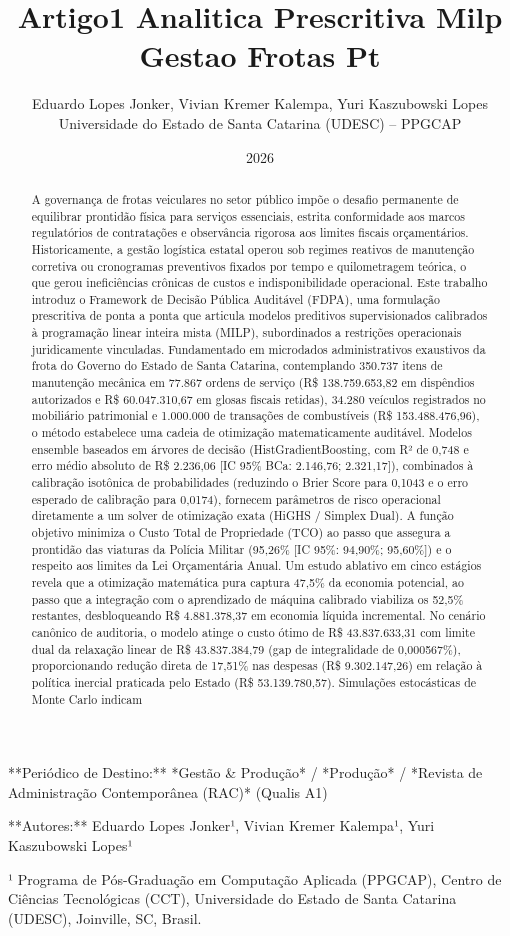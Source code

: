 \documentclass[10pt,a4paper,journal]{article}
\title{Artigo1 Analitica Prescritiva Milp Gestao Frotas Pt}
\author{Eduardo Lopes Jonker, Vivian Kremer Kalempa, Yuri Kaszubowski Lopes\\ \small Universidade do Estado de Santa Catarina (UDESC) -- PPGCAP}
\date{2026}
\begin{document}
\maketitle

**Periódico de Destino:** *Gestão \& Produção* / *Produção* / *Revista de Administração Contemporânea (RAC)* (Qualis A1)

**Autores:** Eduardo Lopes Jonker¹, Vivian Kremer Kalempa¹, Yuri Kaszubowski Lopes¹

¹ Programa de Pós-Graduação em Computação Aplicada (PPGCAP), Centro de Ciências Tecnológicas (CCT), Universidade do Estado de Santa Catarina (UDESC), Joinville, SC, Brasil.

\begin{abstract}
A governança de frotas veiculares no setor público impõe o desafio permanente de equilibrar prontidão física para serviços essenciais, estrita conformidade aos marcos regulatórios de contratações e observância rigorosa aos limites fiscais orçamentários. Historicamente, a gestão logística estatal operou sob regimes reativos de manutenção corretiva ou cronogramas preventivos fixados por tempo e quilometragem teórica, o que gerou ineficiências crônicas de custos e indisponibilidade operacional. Este trabalho introduz o Framework de Decisão Pública Auditável (FDPA), uma formulação prescritiva de ponta a ponta que articula modelos preditivos supervisionados calibrados à programação linear inteira mista (MILP), subordinados a restrições operacionais juridicamente vinculadas. Fundamentado em microdados administrativos exaustivos da frota do Governo do Estado de Santa Catarina, contemplando 350.737 itens de manutenção mecânica em 77.867 ordens de serviço (R\$ 138.759.653,82 em dispêndios autorizados e R\$ 60.047.310,67 em glosas fiscais retidas), 34.280 veículos registrados no mobiliário patrimonial e 1.000.000 de transações de combustíveis (R\$ 153.488.476,96), o método estabelece uma cadeia de otimização matematicamente auditável. Modelos ensemble baseados em árvores de decisão (HistGradientBoosting, com R² de 0,748 e erro médio absoluto de R\$ 2.236,06 [IC 95\% BCa: 2.146,76; 2.321,17]), combinados à calibração isotônica de probabilidades (reduzindo o Brier Score para 0,1043 e o erro esperado de calibração para 0,0174), fornecem parâmetros de risco operacional diretamente a um solver de otimização exata (HiGHS / Simplex Dual). A função objetivo minimiza o Custo Total de Propriedade (TCO) ao passo que assegura a prontidão das viaturas da Polícia Militar (95,26\% [IC 95\%: 94,90\%; 95,60\%]) e o respeito aos limites da Lei Orçamentária Anual. Um estudo ablativo em cinco estágios revela que a otimização matemática pura captura 47,5\% da economia potencial, ao passo que a integração com o aprendizado de máquina calibrado viabiliza os 52,5\% restantes, desbloqueando R\$ 4.881.378,37 em economia líquida incremental. No cenário canônico de auditoria, o modelo atinge o custo ótimo de R\$ 43.837.633,31 com limite dual da relaxação linear de R\$ 43.837.384,79 (gap de integralidade de 0,000567\%), proporcionando redução direta de 17,51\% nas despesas (R\$ 9.302.147,26) em relação à política inercial praticada pelo Estado (R\$ 53.139.780,57). Simulações estocásticas de Monte Carlo indicam 
\end{abstract}
\end{document}
